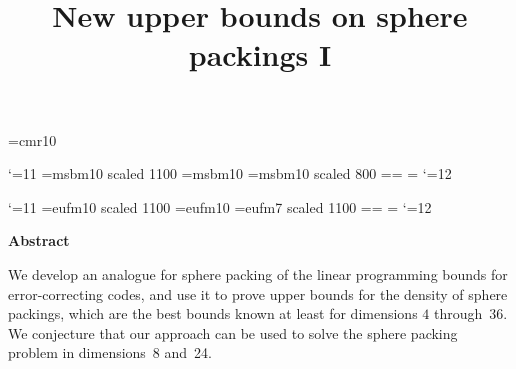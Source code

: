 


\def\bye{}
 \font\tenrm=cmr10
\def\ritem#1{\item[{\rm #1}]}

\def\eqref#1{(\ref{#1})}
\catcode`\@=11
\font\twelvemsb=msbm10 scaled 1100
\font\tenmsb=msbm10
\font\ninemsb=msbm10 scaled 800
\newfam\msbfam
\textfont\msbfam=\twelvemsb  \scriptfont\msbfam=\ninemsb
  \scriptscriptfont\msbfam=\ninemsb
\def\msb@{\hexnumber@\msbfam}
\def\Bbb{\relax\ifmmode\let\next\Bbb@\else
 \def\next{\errmessage{Use \string\Bbb\space only in math
mode}}\fi\next}
\def\Bbb@#1{{\Bbb@@{#1}}}
\def\Bbb@@#1{\fam\msbfam#1}
\catcode`\@=12


 \catcode`\@=11
\font\twelveeuf=eufm10 scaled 1100
\font\teneuf=eufm10
\font\nineeuf=eufm7 scaled 1100%
\newfam\euffam
\textfont\euffam=\twelveeuf  \scriptfont\euffam=\teneuf
  \scriptscriptfont\euffam=\nineeuf
\def\euf@{\hexnumber@\euffam}
\def\frak{\relax\ifmmode\let\next\frak@\else
 \def\next{\errmessage{Use \string\frak\space only in math
mode}}\fi\next}
\def\frak@#1{{\frak@@{#1}}}
\def\frak@@#1{\fam\euffam#1}
\catcode`\@=12

\title{New upper bounds on sphere packings I} %
\shorttitle{} %



\newcommand{\R}{{\Bbb R}}
\newcommand{\Z}{{\Bbb Z}}
\newcommand{\Vol}{\mathop{\textup{vol}}}
\newcommand{\supp}{\mathop{\textup{supp}}}
\newcommand{\newchi}{\chi^{\phantom0}}


\centerline{\bf Abstract}
We develop an analogue for sphere packing of the linear
programming bounds for error-correcting codes, and use it to prove
upper bounds for the density of sphere packings, which are the
best bounds known at least for dimensions $4$ through~$36$. We
conjecture that our approach can be used to solve the sphere
packing problem in dimensions~8 and~24.

